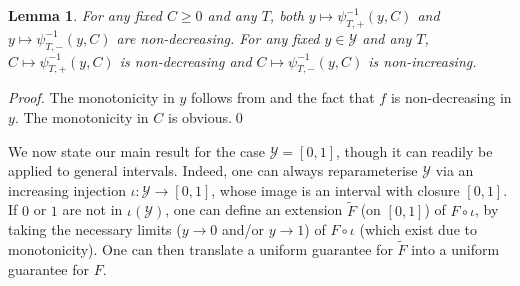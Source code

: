 \documentclass[3p, authoryear, 10pt]{elsarticle}%
\newtheorem{lemma}{Lemma}
\newcommand{\Y}{\mathcal Y}
\begin{document}
\begin{lemma}\label{lemma:monul}
    For any fixed $C\geq 0$ and any $T$, both $y\mapsto\psi_{T,+}^{-1}(y,C)$ and $y\mapsto\psi_{T,-}^{-1}(y,C)$ are non-decreasing. For any fixed $y\in\Y$ and any $T$, $C\mapsto\psi_{T,+}^{-1}(y,C)$ is non-decreasing and $C\mapsto\psi_{T,-}^{-1}(y,C)$ is non-increasing.
\end{lemma}
\begin{proof}
    The monotonicity in $y$ follows from  and the fact that $f$ is non-decreasing in $y$. The monotonicity in $C$ is obvious.\qed
\end{proof}

We now state our main result for the case $\Y=[0,1]$, though it can readily be applied to general intervals. Indeed, one can always reparameterise $\Y$ via an increasing injection $\iota:\Y\to[0,1]$, whose image is an interval with closure $[0,1]$. If $0$ or $1$ are not in $\iota(\Y)$, one can define an extension $\tilde F$ (on $[0,1]$) of $F\circ\iota$, by taking the necessary limits ($y\to0$ and/or $y\to1$) of $F\circ\iota$ (which exist due to monotonicity). One can then translate a uniform guarantee for $\tilde F$ into a uniform guarantee for $F$.
\end{document}
